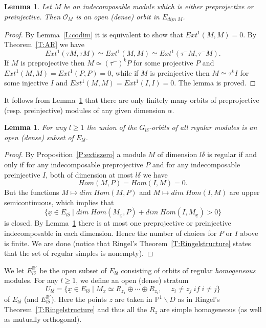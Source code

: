 \documentclass[a4paper,10pt]{amsart}
\def\a{\alpha}
\def\ux{\underline{x}}
\newtheorem{lem}[theo]{Lemma}
\numberwithin{equation}{section}
\begin{document}
\vspace{.1in}

\begin{lem}\label{L:231} Let $M$ be an indecomposable module which is either preprojective or preinjective. Then $\mathcal{O}_M$ is an open (dense) orbit in $E_{\underline{dim}\;M}$.
\end{lem}
\begin{proof} By Lemma~\ref{L:codim} it is equivalent to show that $Ext^1(M,M)=0$.
By Theorem~\ref{T:AR} we have 
$$Ext^1(\tau M, \tau M) \simeq Ext^1(M,M) \simeq Ext^1(\tau^-M, \tau^-M).$$
If $M$ is preprojective then $M\simeq (\tau^-)^k P$ for some projective $P$ and $Ext^1(M,M)=Ext^1(P,P)=0$, while if $M$ is preinjective then $M \simeq \tau^k I$ for some injective $I$ and $Ext^1(M,M) =Ext^1(I,I)=0$. The lemma is proved.\end{proof}

\vspace{.1in}

It follows from Lemma~\ref{L:231} that there are only finitely many orbits of preprojective (resp. preinjective) modules of any given dimension $\a$. 

\vspace{.1in}

\begin{lem} For any $l \geq 1$ the union of the $G_{l\delta}$-orbits of all regular modules is an open (dense) subset of $E_{l\delta}$.
\end{lem}
\begin{proof} By Proposition~\ref{P:extiszero} a module $M$ of dimension $l\delta$ is regular if and only if for any indecomposable preprojective $P$ and for any indecomposable preinjective $I$, both of dimension at most $l\delta$ we have
$$Hom(M,P)=Hom(I,M)=0.$$
But the functions $M \mapsto dim\;Hom(M,P)$ and $M \mapsto dim\;Hom(I,M)$ are upper semicontinuous, which implies that 
$$\{\ux \in E_{l\delta}\;|\; dim\;Hom(M_{\ux},P) + dim\;Hom(I,M_{\ux}) >0\}$$
is closed. By Lemma~\ref{L:231} there is at most one preprojective or preinjective indecomposable in each dimension. Hence the number of choices for $P$ or $I$ above is finite. We are done (notice that Ringel's Theorem~\ref{T:Ringelstructure} states that the set of regular simples is nonempty). \end{proof}

\vspace{.1in}

We let $E_{l\delta}^{\mathbb{R}'}$ be the open subset of $E_{l\delta}$ consisting of orbits of regular \textit{homogeneous} modules. For any $l \geq 1$, we define an open (dense) stratum 
$$U_{l \delta}=\big\{ \ux \in E_{l\delta}\;|\; M_{\ux} \simeq R_{z_1}\oplus \cdots \oplus R_{z_l},\quad \;z_i \neq z_j\;if\;i \neq j\big\}$$
of $E_{l\delta}$ (and $E_{l\delta}^{\mathbb{R}'}$). Here the points $z$ are taken in $\mathbb{P}^1\backslash D$ as in Ringel's Theorem~\ref{T:Ringelstructure} and thus all the $R_z$ are simple homogeneous (as well as mutually orthogonal).
\end{document}
